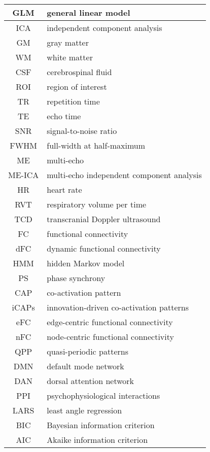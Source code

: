 \begin{table}[h]
\begin{tabular}{|c|p{}|}
    \hline
    GLM & general linear model \\
    \hline
    ICA & independent component analysis \\
    \hline
    GM & gray matter \\
    \hline
    WM & white matter \\
    \hline
    CSF & cerebrospinal fluid \\
    \hline
    ROI & region of interest \\
    \hline
    TR & repetition time \\
    \hline
    TE & echo time \\
    \hline
    SNR & signal-to-noise ratio \\
    \hline
    FWHM & full-width at half-maximum \\
    \hline
    ME & multi-echo \\
    \hline
    ME-ICA & multi-echo independent component analysis \\
    \hline
    HR & heart rate \\
    \hline
    RVT & respiratory volume per time \\
    \hline
    TCD & transcranial Doppler ultrasound \\
    \hline
    FC & functional connectivity \\
    \hline
    dFC & dynamic functional connectivity \\
    \hline
    HMM & hidden Markov model \\
    \hline
    PS & phase synchrony \\
    \hline
    CAP & co-activation pattern \\
    \hline
    iCAPs & innovation-driven co-activation patterns \\
    \hline
    eFC & edge-centric functional connectivity \\
    \hline
    nFC & node-centric functional connectivity \\
    \hline
    QPP & quasi-periodic patterns \\
    \hline
    DMN & default mode network \\
    \hline
    DAN & dorsal attention network \\
    \hline
    PPI & psychophysiological interactions \\
    \hline
    LARS & least angle regression \\
    \hline
    BIC & Bayesian information criterion \\
    \hline
    AIC & Akaike information criterion \\

\end{tabular}
\end{table}
